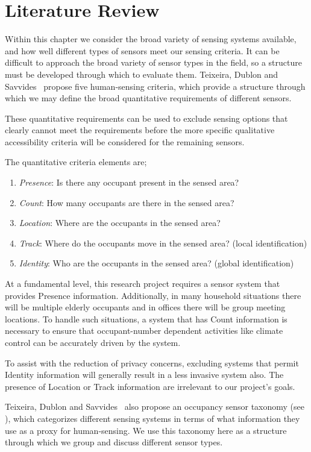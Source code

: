 \documentclass[../thesis/thesis.tex]{subfiles}
\begin{document}
\chapter{Literature Review}
\label{chap:litreview}

Within this chapter we consider the broad variety of sensing systems available, and how well different types of sensors meet our sensing criteria. It can be difficult to approach the broad variety of sensor types in the field, so a structure must be developed through which to evaluate them. Teixeira, Dublon and Savvides~\cite{teixeira2010survey} propose five human-sensing criteria, which provide a structure through which we may define the broad quantitative requirements of different sensors.

These quantitative requirements can be used to exclude sensing options that clearly cannot meet the requirements before the more specific qualitative accessibility criteria will be considered for the remaining sensors. 

The quantitative criteria elements are;
\begin{enumerate}
 \item \emph{Presence}: Is there any occupant present in the sensed area?
 \item \emph{Count}: How many occupants are there in the sensed area?
 \item \emph{Location}: Where are the occupants in the sensed area?
 \item \emph{Track}: Where do the occupants move in the sensed area? (local identification)
 \item \emph{Identity}: Who are the occupants in the sensed area? (global identification)
\end{enumerate}

At a fundamental level, this research project requires a sensor system that provides Presence information. Additionally, in many household situations there will be multiple elderly occupants and in offices there will be group meeting locations. To handle such situations, a system that has Count information is necessary to ensure that occupant-number dependent activities like climate control can be accurately driven by the system.

To assist with the reduction of privacy concerns, excluding systems that permit Identity information will generally result in a less invasive system also. The presence of Location or Track information are irrelevant to our project's goals.

Teixeira, Dublon and Savvides~\cite{teixeira2010survey} also propose an occupancy sensor taxonomy (see ), which categorizes different sensing systems in terms of what information they use as a proxy for human-sensing. We use this taxonomy here as a structure through which we group and discuss different sensor types.
\end{document}

